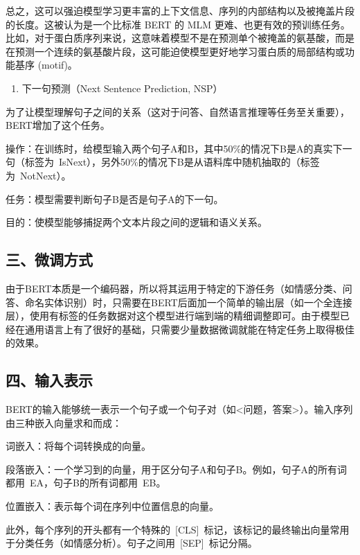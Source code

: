 总之，这可以强迫模型学习更丰富的上下文信息、序列的内部结构以及被掩盖片段的长度。这被认为是一个比标准 BERT 的 MLM 更难、也更有效的预训练任务。比如，对于蛋白质序列来说，这意味着模型不是在预测单个被掩盖的氨基酸，而是在预测一个连续的氨基酸片段，这可能迫使模型更好地学习蛋白质的局部结构或功能基序 (motif)。

\begin{enumerate}
\def\labelenumi{\arabic{enumi}.}
\setcounter{enumi}{1}
\tightlist
\item
  下一句预测（Next Sentence Prediction, NSP）
\end{enumerate}

为了让模型理解句子之间的关系（这对于问答、自然语言推理等任务至关重要），BERT增加了这个任务。

操作：在训练时，给模型输入两个句子A和B，其中50\%的情况下B是A的真实下一句（标签为~IsNext），另外50\%的情况下B是从语料库中随机抽取的（标签为~NotNext）。

任务：模型需要判断句子B是否是句子A的下一句。

目的：使模型能够捕捉两个文本片段之间的逻辑和语义关系。

\hypertarget{ux4e09ux5faeux8c03ux65b9ux5f0f}{%
\subsection{三、微调方式}\label{ux4e09ux5faeux8c03ux65b9ux5f0f}}

由于BERT本质是一个编码器，所以将其运用于特定的下游任务（如情感分类、问答、命名实体识别）时，只需要在BERT后面加一个简单的输出层（如一个全连接层），使用有标签的任务数据对这个模型进行端到端的精细调整即可。由于模型已经在通用语言上有了很好的基础，只需要少量数据微调就能在特定任务上取得极佳的效果。

\hypertarget{ux56dbux8f93ux5165ux8868ux793a}{%
\subsection{四、输入表示}\label{ux56dbux8f93ux5165ux8868ux793a}}

BERT的输入能够统一表示一个句子或一个句子对（如\textless 问题，答案\textgreater）。输入序列由三种嵌入向量求和而成：

词嵌入：将每个词转换成的向量。

段落嵌入：一个学习到的向量，用于区分句子A和句子B。例如，句子A的所有词都用~EA，句子B的所有词都用~EB。

位置嵌入：表示每个词在序列中位置信息的向量。

此外，每个序列的开头都有一个特殊的~{[}CLS{]}~标记，该标记的最终输出向量常用于分类任务（如情感分析）。句子之间用~{[}SEP{]}~标记分隔。

